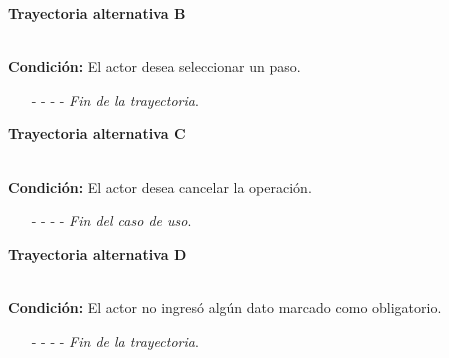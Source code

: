 \hypertarget{CU12-1-6-2:TAB}{\textbf{Trayectoria alternativa B}}\\
\noindent \textbf{Condición:} El actor desea seleccionar un paso.
\begin{enumerate}
	\UCpaso[\UCactor] Ingresa el token {\em P·}. 
	\UCpaso[\UCsist] Obtiene los pasos del caso de uso.
	\UCpaso[\UCsist] Muestra una lista con los pasos encontradas.
	\UCpaso[\UCactor] Selecciona un paso de la lista.
	\UCpaso[\UCsist] Verifica que el nombre del caso de uso al que pertenece el paso no contenga espacios. \hyperlink{CU12-1-6-2:TAI}{[Trayectoria I]}
	\UCpaso[\UCsist] Agrega la clave del caso de uso al que pertenece el paso al texto, seguido del signo ''·''. \label{CU12.1.6.2-TA6}
	\UCpaso[\UCsist] Agrega el número del caso de uso al texto, seguido del signo '':''.
	\UCpaso[\UCsist] Agrega el nombre del caso de uso al texto, seguido del signo '':''.
	\UCpaso[\UCsist] Agrega la clave de la trayectoria a la que pertenece el paso al texto, seguido del signo ''·''.
	\UCpaso[\UCsist] Agrega el número del paso seleccionado al texto.
	\UCpaso Continúa en el paso \ref{CU12.1.6.2-P6} de la trayectoria principal.
	\item[- -] - - {\em {Fin de la trayectoria}}.%
\end{enumerate}
\hypertarget{CU12-1-6-2:TAC}{\textbf{Trayectoria alternativa C}}\\
\noindent \textbf{Condición:} El actor desea cancelar la operación.
\begin{enumerate}
	\UCpaso[\UCactor] Solicita cancelar la operación oprimiendo el botón  de la pantalla .
	\UCpaso[\UCsist] Muestra la pantalla .
	\item[- -] - - {\em {Fin del caso de uso}}.%
\end{enumerate}
\hypertarget{CU12-1-6-2:TAD}{\textbf{Trayectoria alternativa D}}\\
\noindent \textbf{Condición:} El actor no ingresó algún dato marcado como obligatorio.
\begin{enumerate}
	\UCpaso[\UCsist] Muestra el mensaje  señalando el campo que presenta el error en la pantalla .
	\UCpaso Regresa al paso \ref{CU12.1.6.2-P4} de la trayectoria principal.
	\item[- -] - - {\em {Fin de la trayectoria}}.%
\end{enumerate}
